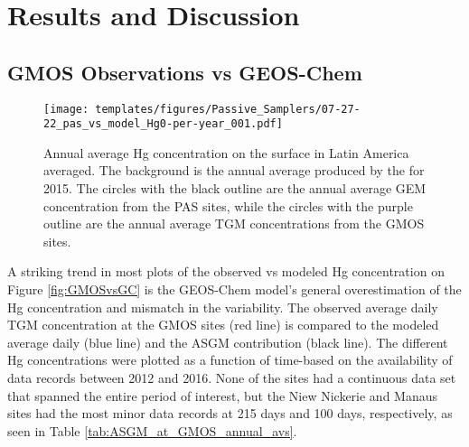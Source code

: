 \section{Results and Discussion}
\subsection{GMOS Observations vs GEOS-Chem}
\begin{figure}[H]
\centering
  \texttt{[image: templates/figures/Passive\_Samplers/07-27-22\_pas\_vs\_model\_Hg0-per-year\_001.pdf]}
  \caption{Annual average Hg concentration on the surface in Latin America averaged. The background is the annual average \hgc produced by the \on for 2015. The circles with the black outline are the annual average GEM concentration from the PAS sites, while the circles with the purple outline are the annual average TGM concentrations from the GMOS sites.}
  \label{fig:06-12-22_pas_vs_model_Hg0-per-year_001}
  
  
\end{figure}
\FloatBarrier
\begin{flushleft}
A striking trend in most plots of the observed vs modeled Hg concentration on Figure \ref{fig:GMOSvsGC} is the GEOS-Chem model's general overestimation of the Hg concentration and mismatch in the variability. The observed average daily TGM concentration at the GMOS sites (red line) is compared to the modeled \on average daily \hg (blue line) and the ASGM contribution (black line). The different Hg concentrations were plotted as a function of time-based on the availability of data records between 2012 and 2016. None of the sites had a continuous data set that spanned the entire period of interest, but the Niew Nickerie and Manaus sites had the most minor data records at 215 days and 100 days, respectively, as seen in Table \ref{tab:ASGM_at_GMOS_annual_avs}.   
\end{flushleft}


                        
